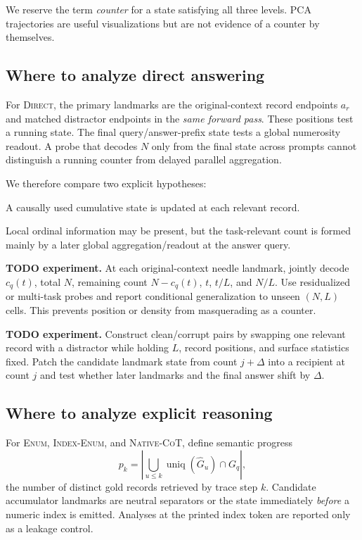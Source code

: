 \documentclass[10pt,twocolumn]{article}
\newcommand{\todoexp}[1]{%
  \par\noindent\textcolor{red!75!black}{\textbf{TODO experiment.} #1}\par}
\newcommand{\direct}{\textsc{Direct}}
\newcommand{\enumplain}{\textsc{Enum}}
\newcommand{\enumindex}{\textsc{Index-Enum}}
\newcommand{\native}{\textsc{Native-CoT}}
\begin{document}
We reserve the term \emph{counter} for a state satisfying all three levels.
PCA trajectories are useful visualizations but are not evidence of a counter by themselves.

\subsection{Where to analyze direct answering}
For \direct, the primary landmarks are the original-context record endpoints $a_r$ and matched
distractor endpoints in the \emph{same forward pass}. These positions test a running state.
The final query/answer-prefix state tests a global numerosity readout. A probe that decodes $N$
only from the final state across prompts cannot distinguish a running counter from delayed
parallel aggregation.

We therefore compare two explicit hypotheses:
\begin{description}[style=nextline]
\item[$H_{\mathrm{run}}$:] A causally used cumulative state is updated at each relevant record.
\item[$H_{\mathrm{agg}}$:] Local ordinal information may be present, but the task-relevant count
is formed mainly by a later global aggregation/readout at the answer query.
\end{description}

\todoexp{At each original-context needle landmark, jointly decode
$c_q(t)$, total $N$, remaining count $N-c_q(t)$, $t$, $t/L$, and $N/L$.
Use residualized or multi-task probes and report conditional generalization to unseen
$(N,L)$ cells. This prevents position or density from masquerading as a counter.}

\todoexp{Construct clean/corrupt pairs by swapping one relevant record with a distractor while
holding $L$, record positions, and surface statistics fixed. Patch the candidate landmark state
from count $j+\Delta$ into a recipient at count $j$ and test whether later landmarks and the final
answer shift by $\Delta$.}

\subsection{Where to analyze explicit reasoning}
For \enumplain, \enumindex, and \native, define semantic progress
\[
    p_k=\left|\bigcup_{u\le k}\operatorname{uniq}(\widehat G_u)\cap G_q\right|,
\]
the number of distinct gold records retrieved by trace step $k$. Candidate accumulator landmarks
are neutral separators or the state immediately \emph{before} a numeric index is emitted.
Analyses at the printed index token are reported only as a leakage control.
\end{document}
